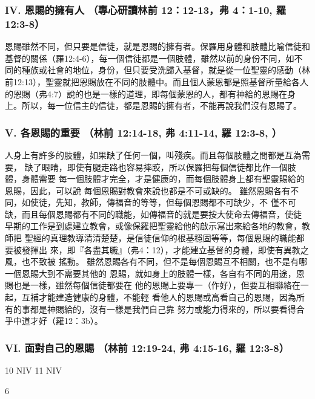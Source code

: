 \subsubsection{IV. 恩賜的擁有人 （專心研讀林前 12：12-13，弗 4：1-10, 羅 12:3-8）}
恩賜雖然不同，但只要是信徒，就是恩賜的擁有者。保羅用身體和肢體比喻信徒和基督的關係（羅12:4-6），每一個信徒都是一個肢體，雖然以前的身份不同，如不同的種族或社會的地位，身份，但只要受洗歸入基督，就是從一位聖靈的感動（林前12:13），聖靈就把恩賜放在不同的肢體中。而且個人蒙恩都是照基督所量給各人的恩賜（弗4:7）說的也是一樣的道理，即每個蒙恩的人，都有神給的恩賜在身上。所以，每一位信主的信徒，都是恩賜的擁有者，不能再說我們沒有恩賜了。

\subsubsection{V. 各恩賜的重要 （林前 12:14-18, 弗 4:11-14, 羅 12:3-8, ）}


人身上有許多的肢體，如果缺了任何一個，叫殘疾。而且每個肢體之間都是互為需要，
缺了眼睛，即使有腿走路也容易摔跤，所以保羅把每個信徒都比作一個肢體，身體需要
每一個肢體才完全，才是健康的，而每個肢體身上都有聖靈賜給的恩賜，因此，可以說
每個恩賜對教會來說也都是不可或缺的。
雖然恩賜各有不同，如使徒，先知，教師，傳福音的等等，但每個恩賜都不可缺少，不
僅不可缺，而且每個恩賜都有不同的職能，如傳福音的就是要按大使命去傳福音，使徒
早期的工作是到處建立教會，或像保羅把聖靈給他的啟示寫出來給各地的教會，教師把
聖經的真理教導清清楚楚，是信徒信仰的根基穩固等等，每個恩賜的職能都要被發揮出
來，即『各盡其職』（弗4：12），才能建立基督的身體，即使有異教之風，也不致被
搖動。
雖然恩賜各有不同，但不是每個恩賜互不相關，也不是有哪一個恩賜大到不需要其他的
恩賜，就如身上的肢體一樣，各自有不同的用途，恩賜也是一樣，雖然每個信徒都要在
他的恩賜上要專一（作好），但要互相聯絡在一起，互補才能建造健康的身體，不能輕
看他人的恩賜或高看自己的恩賜，因為所有的事都是神賜給的，沒有一樣是我們自己靠
努力或能力得來的，所以要看得合乎中道才好（羅12：3b）。


\subsubsection{VI. 面對自己的恩賜 （林前 12:19-24, 弗 4:15-16, 羅 12:3-8）}


10 NIV
11 NIV

6

